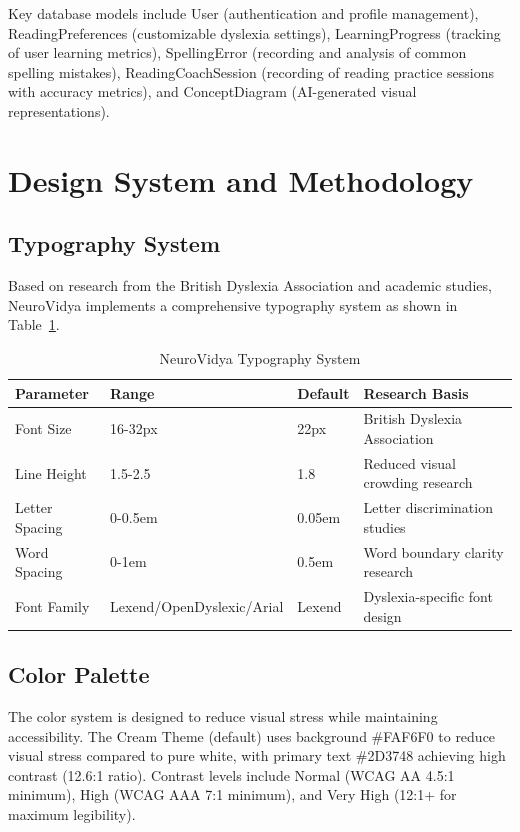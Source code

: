 \documentclass[journal]{IEEEtran}
\begin{document}
Key database models include User (authentication and profile management), ReadingPreferences (customizable dyslexia settings), LearningProgress (tracking of user learning metrics), SpellingError (recording and analysis of common spelling mistakes), ReadingCoachSession (recording of reading practice sessions with accuracy metrics), and ConceptDiagram (AI-generated visual representations).

\section{Design System and Methodology}

\subsection{Typography System}

Based on research from the British Dyslexia Association and academic studies, NeuroVidya implements a comprehensive typography system as shown in Table~\ref{tab:typography}.

\begin{table}[h]
\centering
\caption{NeuroVidya Typography System}
\label{tab:typography}
\begin{tabular}{@{}llll@{}}
\toprule
\textbf{Parameter} & \textbf{Range} & \textbf{Default} & \textbf{Research Basis} \\ \midrule
Font Size & 16-32px & 22px & British Dyslexia Association \\
Line Height & 1.5-2.5 & 1.8 & Reduced visual crowding research \\
Letter Spacing & 0-0.5em & 0.05em & Letter discrimination studies \\
Word Spacing & 0-1em & 0.5em & Word boundary clarity research \\
Font Family & Lexend/OpenDyslexic/Arial & Lexend & Dyslexia-specific font design \\ \bottomrule
\end{tabular}
\end{table}

\subsection{Color Palette}

The color system is designed to reduce visual stress while maintaining accessibility. The Cream Theme (default) uses background \#FAF6F0 to reduce visual stress compared to pure white, with primary text \#2D3748 achieving high contrast (12.6:1 ratio). Contrast levels include Normal (WCAG AA 4.5:1 minimum), High (WCAG AAA 7:1 minimum), and Very High (12:1+ for maximum legibility).
\end{document}
